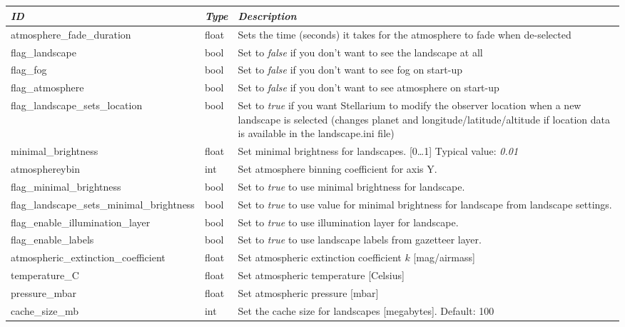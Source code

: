 \subsection{}\label{sec:config.ini:landscape}


\begin{longtabu} to \textwidth {l|l|X}\toprule
\emph{ID}                            & \emph{Type} & \emph{Description}\\\midrule
atmosphere\_fade\_duration                 & float & Sets the time (seconds) it takes for the atmosphere to fade when de-selected\\\midrule
flag\_landscape                            & bool  & Set to \emph{false} if you don't want to see the landscape at all\\\midrule
flag\_fog                                  & bool  & Set to \emph{false} if you don't want to see fog on start-up\\\midrule
flag\_atmosphere                           & bool  & Set to \emph{false} if you don't want to see atmosphere on start-up\\\midrule
flag\_landscape\_sets\_location            & bool  & Set to \emph{true} if you want Stellarium to modify the observer location 
                                                     when a new landscape is selected (changes planet and longitude/latitude/altitude 
                                                     if location data is available in the landscape.ini file)\\\midrule
minimal\_brightness                        & float & Set minimal brightness for landscapes. [0\ldots1] Typical value: \emph{0.01}\\\midrule
atmosphereybin						       & int   & Set atmosphere binning coefficient for axis Y.\\\midrule
flag\_minimal\_brightness                  & bool  & Set to \emph{true} to use minimal brightness for landscape.\\\midrule
flag\_landscape\_sets\_minimal\_brightness & bool  & Set to \emph{true} to use value for minimal brightness for landscape from landscape settings.\\\midrule
flag\_enable\_illumination\_layer          & bool  & Set to \emph{true} to use illumination layer for landscape.\\\midrule
flag\_enable\_labels                       & bool  & Set to \emph{true} to use landscape labels from gazetteer layer.\\\midrule
atmospheric\_extinction\_coefficient       & float & Set atmospheric extinction coefficient $k$ [mag/airmass]\\\midrule
temperature\_C                             & float & Set atmospheric temperature [Celsius]\\\midrule
pressure\_mbar                             & float & Set atmospheric pressure [mbar]\\\midrule
cache\_size\_mb                            & int   & Set the cache size for landscapes [megabytes]. Default: 100\\\bottomrule
\end{longtabu}

